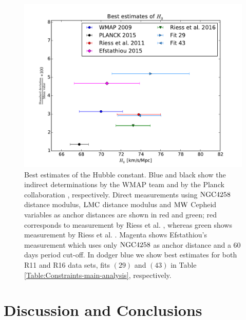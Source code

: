 \begin{figure}[hbtp]
\centering
\includegraphics[width=\textwidth]{figures/chapter-h0/H0_best_values_R16.pdf}
\caption{Best estimates of the Hubble constant. Blue and black show the indirect determinations by the WMAP team \cite{Hinshaw:2012aka} and by the Planck collaboration \cite{Ade:2015xua}, respectively. Direct measurements using $\mathrm{NGC4258}$ distance modulus, $\mathrm{LMC}$ distance modulus and $\mathrm{MW}$ Cepheid variables as anchor distances are shown in red and green; red corresponds to measurement by Riess et al. \cite{Riess:2011yx}, whereas green shows measurement by Riess et al. \cite{Riess:2016jrr}. Magenta shows Efstathiou's measurement \cite{Efstathiou:2013via} which uses only $\mathrm{NGC4258}$ as anchor distance and a $60$ days period cut-off. In dodger blue we show best estimates for both R11 and R16 data sets, fits $(29)$ and $(43)$ in Table \ref{Table:Constraints-main-analysis}, respectively.}
\label{Fig:Best-estimates-H0-R16}
\end{figure}


\section{Discussion and Conclusions}
\label{chapter-h0:Summary}

